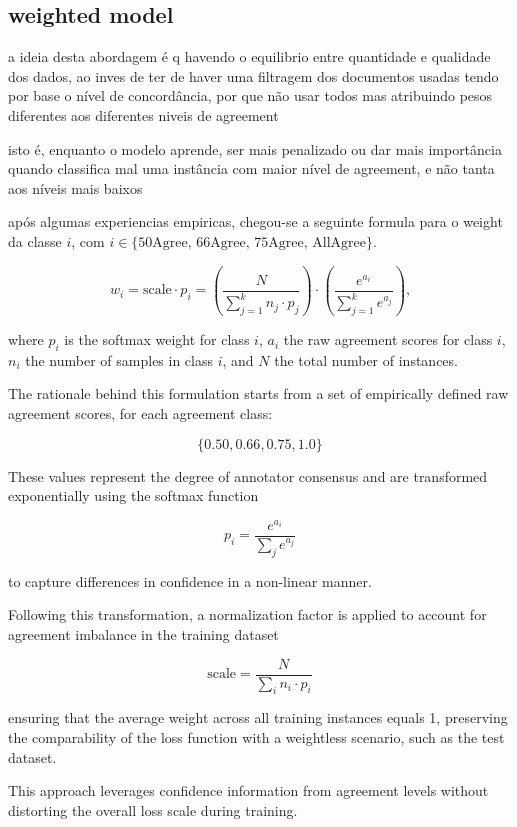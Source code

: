 \documentclass[conference]{IEEEtran}
\begin{document}
\subsection{weighted model}

a ideia desta abordagem é q havendo o equilibrio entre quantidade e qualidade dos dados, ao inves de ter de haver uma filtragem dos documentos usadas tendo por base o nível de concordância, por que não usar todos mas atribuindo pesos diferentes aos diferentes niveis de agreement

isto é, enquanto o modelo aprende, ser mais penalizado ou dar mais importância quando classifica mal uma instância com maior nível de agreement, e não tanta aos níveis mais baixos

após algumas experiencias empiricas, chegou-se a seguinte formula para o weight da classe $i$, com $i \in \{\text{50Agree, 66Agree, 75Agree, AllAgree}\}$.

$$
w_i = \text{scale} \cdot p_i = \left( \frac{N}{\sum_{j=1}^k n_j \cdot p_j} \right) \cdot  \left( \frac{e^{a_i}}{\sum_{j=1}^k e^{a_j}} \right) \text{,}
$$

\noindent where $p_i$ is the softmax weight for class $i$, $a_i$ the raw agreement scores for class $i$, $n_i$ the number of samples in class $i$, and $N$ the total number of instances.

The rationale behind this formulation starts from a set of empirically defined raw agreement scores, for each agreement class:

$$
\{0.50, 0.66, 0.75, 1.0\}
$$

These values represent the degree of annotator consensus and are transformed exponentially using the softmax function

$$
p_i = \frac{e^{a_i}}{\sum_j e^{a_j}}
$$

\noindent to capture differences in confidence in a non-linear manner.

Following this transformation, a normalization factor is applied to account for agreement imbalance in the training dataset

$$
\text{scale} = \frac{N}{\sum_i n_i \cdot p_i}
$$

\noindent ensuring that the average weight across all training instances equals 1, preserving the comparability of the loss function with a weightless scenario, such as the test dataset.

This approach leverages confidence information from agreement levels without distorting the overall loss scale during training.
\end{document}

